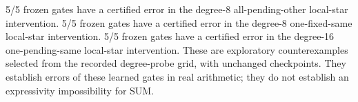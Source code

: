 5/5 frozen gates have a certified error in the degree-8 all-pending-other local-star intervention. 5/5 frozen gates have a certified error in the degree-8 one-fixed-same local-star intervention. 5/5 frozen gates have a certified error in the degree-16 one-pending-same local-star intervention. These are exploratory counterexamples selected from the recorded degree-probe grid, with unchanged checkpoints. They establish errors of these learned gates in real arithmetic; they do not establish an expressivity impossibility for SUM.
